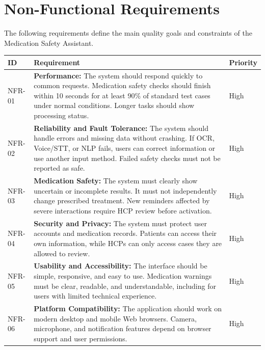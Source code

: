 
\section{Non-Functional Requirements}

The following requirements define the main
quality goals and constraints of the
Medication Safety Assistant.

\begin{longtable}{|L{0.13\textwidth}|L{0.68\textwidth}|L{0.10\textwidth}|}
\hline
\textbf{ID} &
\textbf{Requirement} &
\textbf{Priority}\\ \hline

NFR-01
& \textbf{Performance:}
The system should respond quickly to common
requests. Medication safety checks should
finish within 10 seconds for at least 90\%
of standard test cases under normal conditions.
Longer tasks should show processing status.
& High
\\ \hline

NFR-02
& \textbf{Reliability and Fault Tolerance:}
The system should handle errors and missing
data without crashing. If OCR, Voice/STT,
or NLP fails, users can correct information
or use another input method. Failed safety
checks must not be reported as safe.
& High
\\ \hline

NFR-03
& \textbf{Medication Safety:}
The system must clearly show uncertain or
incomplete results. It must not independently
change prescribed treatment. New reminders
affected by severe interactions require
HCP review before activation.
& High
\\ \hline

NFR-04
& \textbf{Security and Privacy:}
The system must protect user accounts and
medication records. Patients can access
their own information, while HCPs can only
access cases they are allowed to review.
& High
\\ \hline

NFR-05
& \textbf{Usability and Accessibility:}
The interface should be simple, responsive,
and easy to use. Medication warnings must
be clear, readable, and understandable,
including for users with limited
technical experience.
& High
\\ \hline

NFR-06
& \textbf{Platform Compatibility:}
The application should work on modern
desktop and mobile Web browsers.
Camera, microphone, and notification
features depend on browser support
and user permissions.
& High
\\ \hline


\end{longtable}
